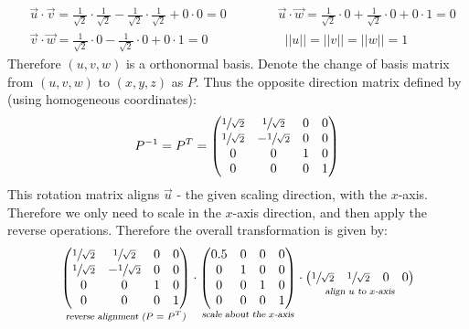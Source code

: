 \documentclass{article}
\newcommand{\norm}[1]{\vert\vert#1\vert\vert}
\begin{document}
\begin{enumerate}
        \begin{align*}
            &\vec{u}\cdot\vec{v} = \frac{1}{\sqrt{2}}\cdot\frac{1}{\sqrt{2}}-\frac{1}{\sqrt{2}}\cdot\frac{1}{\sqrt{2}}+0\cdot 0 = 0\qquad\qquad
            \vec{u}\cdot\vec{w} = \frac{1}{\sqrt{2}}\cdot0+\frac{1}{\sqrt{2}}\cdot0+0\cdot1 = 0\\
            &\vec{v}\cdot\vec{w} = \frac{1}{\sqrt{2}}\cdot0-\frac{1}{\sqrt{2}}\cdot0+0\cdot1 = 0\qquad\qquad\qquad
            \norm{u} = \norm{v} = \norm{w} = 1
        \end{align*}
        Therefore $(u,v,w)$ is a orthonormal basis. Denote the change of basis matrix from $(u,v,w)$ to $(x,y,z)$ as $P$. Thus the opposite direction matrix defined by (using homogeneous coordinates):
        $$
            P^{-1} = P^T = \begin{pmatrix}
                \sfrac{1}{\sqrt{2}}&\sfrac{1}{\sqrt{2}}&0&0\\
                \sfrac{1}{\sqrt{2}}&-\sfrac{1}{\sqrt{2}}&0&0\\
                0&0&1&0\\
                0&0&0&1
            \end{pmatrix}
        $$
        This rotation matrix aligns $\vec{u}$ - the given scaling direction, with the $x$-axis. Therefore we only need to scale in the $x$-axis direction, and then apply the reverse operations. Therefore the overall transformation is given by:
        $$
            \underset{\textsl{reverse alignment ($P=P^T$)}}{\begin{pmatrix}
                \sfrac{1}{\sqrt{2}}&\sfrac{1}{\sqrt{2}}&0&0\\
                \sfrac{1}{\sqrt{2}}&-\sfrac{1}{\sqrt{2}}&0&0\\
                0&0&1&0\\
                0&0&0&1
            \end{pmatrix}}
            \cdot
            \underset{\textsl{scale about the $x$-axis}}{\begin{pmatrix}
                0.5&0&0&0\\
                0&1&0&0\\
                0&0&1&0\\
                0&0&0&1
            \end{pmatrix}}
            \cdot
            \underset{\textsl{align $u$ to $x$-axis}}{\begin{pmatrix}
                \sfrac{1}{\sqrt{2}}&\sfrac{1}{\sqrt{2}}&0&0\\

\end{pmatrix}}$$
\end{enumerate}
\end{document}
